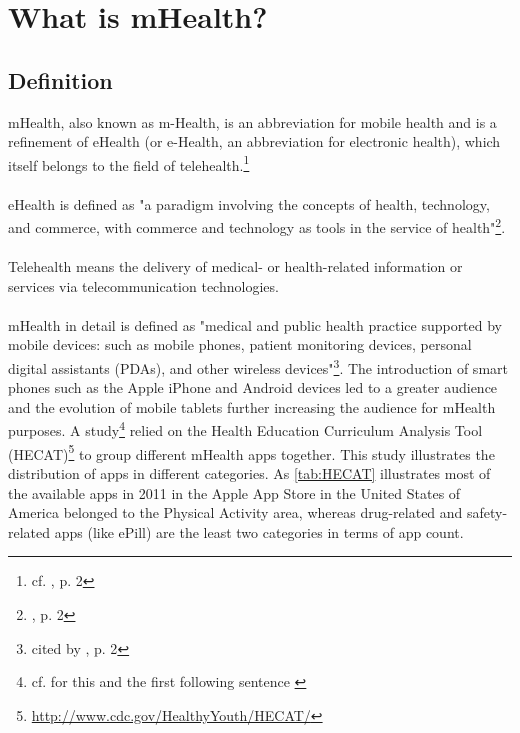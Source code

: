\section{What is mHealth?}
\subsection{Definition}
mHealth, also known as m-Health, is an abbreviation for mobile health and is a refinement of eHealth (or e-Health, an abbreviation for electronic health), which itself belongs to the field of telehealth.\footnote{cf. \cite{MartinezPerez.2013}, p. 2}
\\
\\
eHealth is defined as "a paradigm involving the concepts of health, technology, and commerce, with commerce and technology as tools in the service of health"\footnote{\cite{MartinezPerez.2013}, p. 2}.
\\
\\
Telehealth means the delivery of medical- or health-related information or services via telecommunication technologies.
\\
\\
mHealth in detail is defined as "medical and public health practice supported by mobile devices: such as mobile phones, patient monitoring devices, personal digital assistants (PDAs), and other wireless devices"\footnote{\cite{WorldHealthOrganization.2011} cited by \cite{MartinezPerez.2013}, p. 2}. The introduction of smart phones such as the Apple iPhone and Android devices led to a greater audience and the evolution of mobile tablets further increasing the audience for mHealth purposes. A study\footnote{cf. for this and the first following sentence \cite{West.2012}} relied on the Health Education Curriculum Analysis Tool (HECAT)\footnote{\url{http://www.cdc.gov/HealthyYouth/HECAT/}} to group different mHealth apps together. This study illustrates the distribution of apps in different categories. As \ref{tab:HECAT} illustrates most of the available apps in 2011 in the Apple App Store in the United States of America belonged to the Physical Activity area, whereas drug-related and safety-related apps (like ePill) are the least two categories in terms of app count.
